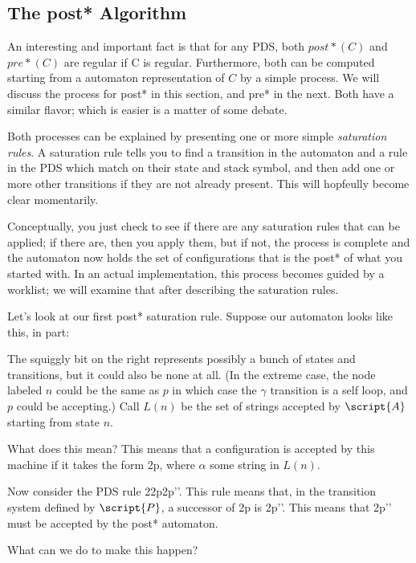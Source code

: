 \documentclass{article}
\newcommand{\config}{2}{\ensuremath{\langle #1, #2 \rangle}}
\newcommand{\rule}{2}{\ensuremath{#1 \righthookarrow #2}}
\begin{document}
\begin{defintion}
\subsection{The post* Algorithm}

An interesting and important fact is that for any PDS, both $post*(C)$
and $pre*(C)$ are regular if C is regular. Furthermore, both can be
computed starting from a automaton representation of $C$ by a simple
process. We will discuss the process for post* in this section, and
pre* in the next. Both have a similar flavor; which is easier is a
matter of some debate.

Both processes can be explained by presenting one or more simple
\emph{saturation rules}. A saturation rule tells you to find a
transition in the automaton and a rule in the PDS which match on their
state and stack symbol, and then add one or more other transitions if
they are not already present. This will hopfeully become clear
momentarily. 

Conceptually, you just check to see if there are any saturation rules
that can be applied; if there are, then you apply them, but if not,
the process is complete and the automaton now holds the set of
configurations that is the post* of what you started with. In an
actual implementation, this process becomes guided by a worklist; we
will examine that after describing the saturation rules.


Let's look at our first post* saturation rule. Suppose our automaton
looks like this, in part:



The squiggly bit on the right represents possibly a bunch of states
and transitions, but it could also be none at all. (In the extreme
case, the node labeled $n$ could be the same as $p$ in which case the
$\gamma$ transition is a self loop, and $p$ could be accepting.) Call
$L(n)$ be the set of strings accepted by $\script{A}$ starting from
state $n$.

What does this mean? This means that a configuration is accepted by
this machine if it takes the form \config{p}{\gamma\alpha}, where
$\alpha$ some string in $L(n)$.

Now consider the PDS rule
\rule{\config{p}{\gamma}}{\config{p'}{\gamma'}}. This rule means that,
in the transition system defined by $\script{P}$, a successor of
\config{p}{\gamma\alpha} is \config{p'}{\gamma'\alpha}. This means
that \config{p'}{\gamma'\alpha} must be accepted by the post*
automaton.

What can we do to make this happen?


\end{defintion}
\end{document}

